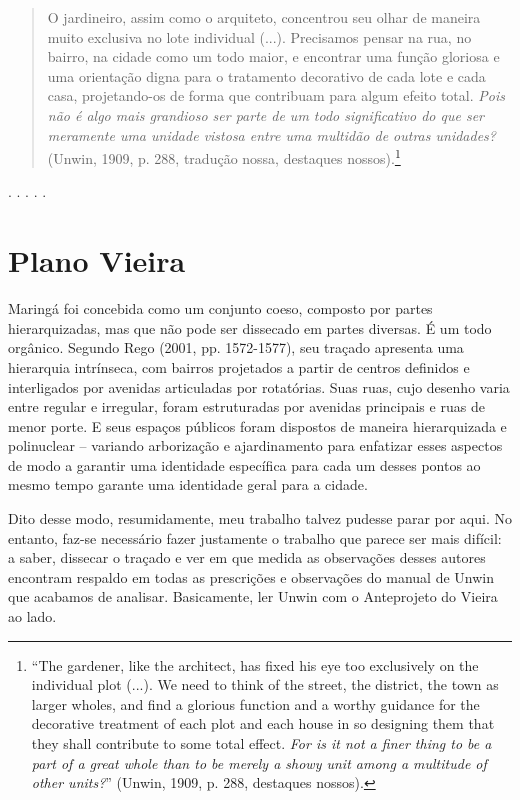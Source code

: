 \documentclass[12pt, a4paper]{book} %
\begin{document}
        \begin{quotation}
            O jardineiro, assim como o arquiteto, concentrou seu olhar de maneira muito exclusiva no lote individual (...). Precisamos pensar na rua, no bairro, na cidade como um todo maior, e encontrar uma função gloriosa e uma orientação digna para o tratamento decorativo de cada lote e cada casa, projetando-os de forma que contribuam para algum efeito total. \textit{Pois não é algo mais grandioso ser parte de um todo significativo do que ser meramente uma unidade vistosa entre uma multidão de outras unidades?} (Unwin, 1909, p. 288, tradução nossa, destaques nossos).\footnote[99]{``The gardener, like the architect, has fixed his eye too exclusively on the individual plot (...). We need to think of the street, the district, the town as larger wholes, and find a glorious function and a worthy guidance for the decorative treatment of each plot and each house in so designing them that they shall contribute to some total effect. \textit{For is it not a finer thing to be a part of a great whole than to be merely a showy unit among a multitude of other units?}'' (Unwin, 1909, p. 288, destaques nossos).}
        \end{quotation}
        

        \begin{center}
            . . . . .
        \end{center} 

            \section{Plano Vieira}

        Maringá foi concebida como um conjunto coeso, composto por partes hierarquizadas, mas que não pode ser dissecado em partes diversas. É um todo orgânico. Segundo Rego (2001, pp. 1572-1577), seu traçado apresenta uma hierarquia intrínseca, com bairros projetados a partir de centros definidos e interligados por avenidas articuladas por rotatórias. Suas ruas, cujo desenho varia entre regular e irregular, foram estruturadas por avenidas principais e ruas de menor porte. E seus espaços públicos foram dispostos de maneira hierarquizada e polinuclear – variando arborização e ajardinamento para enfatizar esses aspectos de modo a garantir uma identidade específica para cada um desses pontos ao mesmo tempo garante uma identidade geral para a cidade.

        Dito desse modo, resumidamente, meu trabalho talvez pudesse parar por aqui. No entanto, faz-se necessário fazer justamente o trabalho que parece ser mais difícil: a saber, dissecar o traçado e ver em que medida as observações desses autores encontram respaldo em todas as prescrições e observações do manual de Unwin que acabamos de analisar. Basicamente, ler Unwin com o Anteprojeto do Vieira ao lado.
\end{document}

